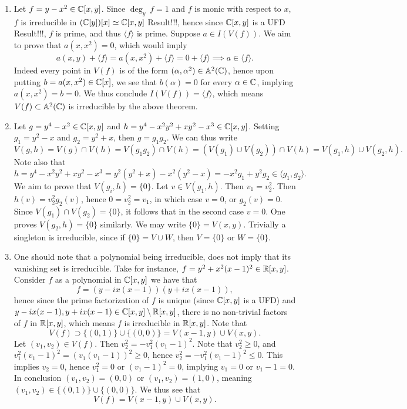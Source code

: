 \begin{example}
    \begin{enumerate}
        \item Let $f = y-x^2\in \mathbb{C}[x,y]$. Since $\deg_y\ f = 1$ and $f$ is monic with respect to $x$, $f$ is irreducible in $(\mathbb{C}[y])[x]\simeq \mathbb{C}[x,y]$ {\LARGE Result!!!}, hence since $\mathbb{C}[x,y]$ is a UFD {\LARGE Result!!!}, $f$ is prime, and thus $\langle f\rangle$ is prime. Suppose $a\in I(V(f))$. We aim to prove that $a(x,x^2) = 0$, which would imply
        $$a(x,y) + \langle f\rangle = a(x,x^2) + \langle f \rangle =0 + \langle f \rangle \implies  a \in \langle f\rangle.$$
        Indeed every point in $V(f)$ is of the form $(\alpha,\alpha^2)\in \mathbb{A}^2(\mathbb{C})$, hence upon putting $b = a(x,x^2) \in \mathbb{C}[x]$, we see that $b(\alpha) = 0$ for every $\alpha\in\mathbb{C}  $, implying $a(x,x^2)=b=0$. We thus conclude $I(V(f))=\langle f\rangle$, which means $V(f)\subset \mathbb{A}^2(\mathbb{C})$ is irreducible by the above theorem. 
        \item Let $g = y^4 - x^2 \in \mathbb{C}[x,y]$ and $h = y^4 -x^2y^2+xy^2-x^3\in \mathbb{C}[x,y]$. Setting $g_1 = y^2-x$ and $g_2 = y^2+x$, then $g=g_1g_2$. We can thus write 
        $$V(g,h) = V(g)\cap V(h) = V(g_1g_2)\cap V(h)= (V(g_1)\cup V(g_2))\cap V(h) = V(g_1,h) \cup V(g_2,h).$$
        Note also that
        $$h=y^4 -x^2y^2+xy^2-x^3= y^2(y^2+x)-x^2(y^2-x) = -x^2g_1+y^2g_2\in \langle g_1,g_2\rangle.$$
        We aim to prove that $V(g_i,h)=\{0\}$. Let $v\in V(g_1,h).$ Then $v_1 = v_2^2$. Then $h(v) = v_2^2g_2(v)$, hence $0=v_2^2 = v_1$, in which case $v=0$, or $g_2(v)=0$. Since $V(g_1)\cap V(g_2) =\{0\}$, it follows that in the second case $v = 0$. One proves $V(g_2,h)=\{0\}$ similarly. We may write $\{0\} = V(x,y)$. Trivially a singleton is irreducible, since if $\{0\} = V\cup W$, then $V=\{0\}$ or $W = \{0\}$.
        \item One should note that a polynomial being irreducible, does not imply that its vanishing set is irreducible. Take for instance, $f = y^2 + x^2(x-1)^2\in \mathbb{R}[x,y]$. Consider $f$ as a polynomial in $\mathbb{C}[x,y]$ we have that 
        $$f  = (y-ix(x-1))(y+ix(x-1)),$$
        hence since the prime factorization of $f$ is unique (since $\mathbb{C}[x,y]$ is a UFD) and $y-ix(x-1),y+ix(x-1)\in \mathbb{C}[x,y]\setminus \mathbb{R}[x,y]$, there is no non-trivial factors of $f$ in $\mathbb{R}[x,y]$, which means $f$ is irreducible in $\mathbb{R}[x,y]$. Note that 
        $$V(f)\supset  \{(0,1)\}\cup\{(0,0)\} = V(x-1,y)\cup V(x,y).$$
        Let $(v_1,v_2)\in V(f)$. Then $v_2^2 = -v_1^2(v_1-1)^2$. Note that $v_2^2 \geq 0$, and $v_1^2(v_1-1)^2=(v_1(v_1-1))^2\geq 0$, hence $v_2^2=-v_1^2(v_1-1)^2\leq 0$. This implies $v_2 =0$, hence $v_1^2 = 0$ or $(v_1-1)^2 = 0$, implying $v_1=0$ or $v_1-1=0$. In conclusion $(v_1,v_2)=(0,0)$ or $(v_1,v_2)=(1,0)$, meaning $(v_1,v_2)\in \{(0,1)\}\cup \{(0,0)\}$. We thus see that 
        $$V(f) = V(x-1,y)\cup V(x,y).$$
        \end{enumerate}
\end{example}
